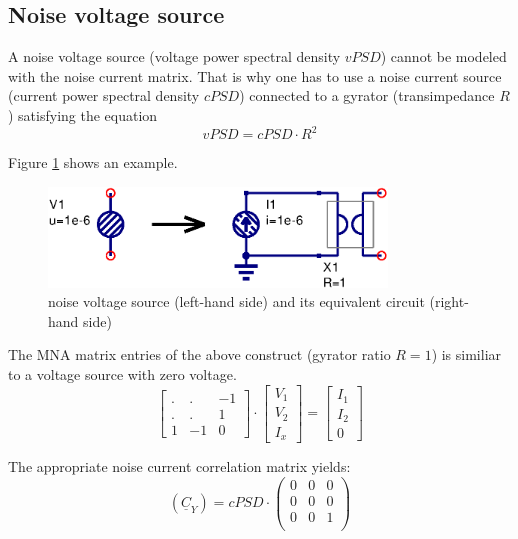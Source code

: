 \subsection{Noise voltage source}

A noise voltage source (voltage power spectral density $vPSD$) cannot
be modeled with the noise current matrix.  That is why one has to use
a noise current source (current power spectral density $cPSD$)
connected to a gyrator (transimpedance $R$) satisfying the equation
\begin{equation}
vPSD = cPSD \cdot R^2
\end{equation}

Figure \ref{fig:Unoise} shows an example.
\begin{figure}[ht]
\begin{center}
\includegraphics[width=9cm]{Unoise}
\end{center}
\caption{noise voltage source (left-hand side) and its equivalent circuit (right-hand side)}
\label{fig:Unoise}
\end{figure}
\FloatBarrier

The MNA matrix entries of the above construct (gyrator ratio $R=1$) is
similiar to a voltage source with zero voltage.
\begin{equation}
\begin{bmatrix}
.&.& -1\\
.&.& 1\\
1 & -1 & 0
\end{bmatrix}
\cdot
\begin{bmatrix}
V_{1}\\
V_{2}\\
I_x
\end{bmatrix}
=
\begin{bmatrix}
I_{1}\\
I_{2}\\
0
\end{bmatrix}
\end{equation}

The appropriate noise current correlation matrix yields:
\begin{equation}
(\underline{C}_Y) = cPSD \cdot
\begin{pmatrix}
 0 & 0 & 0\\
 0 & 0 & 0\\
 0 & 0 & 1\\
\end{pmatrix}
\end{equation}

